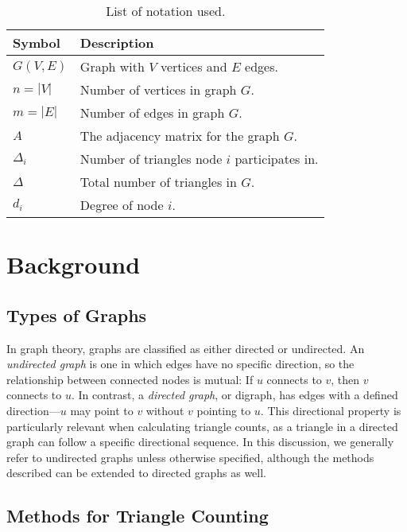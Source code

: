 \documentclass[11pt]{article}
\begin{document}
\begin{table}[ht]
    \centering
    \begin{tabular}{ll}
        \toprule
        \textbf{Symbol} & \textbf{Description} \\
        \midrule
        $G(V, E)$       & Graph with $V$ vertices and $E$ edges. \\
        $n = |V|$       & Number of vertices in graph $G$. \\
        $m = |E|$       & Number of edges in graph $G$. \\
        $A$             & The adjacency matrix for the graph $G$. \\
        $\Delta_i$      & Number of triangles node $i$ participates in. \\
        $\Delta$        & Total number of triangles in $G$. \\
        $d_i$           & Degree of node $i$. \\
        \bottomrule
    \end{tabular}
    \caption{List of notation used.}
    \label{tab:notation}
\end{table}

\section{Background}

\subsection{Types of Graphs}

In graph theory, graphs are classified as either directed or undirected.  
An \emph{undirected graph} is one in which edges have no specific direction, so the relationship between connected nodes is mutual: If $u$ connects to $v$, then $v$ connects to $u$.  
In contrast, a \emph{directed graph}, or digraph, has edges with a defined direction—$u$ may point to $v$ without $v$ pointing to $u$.  
This directional property is particularly relevant when calculating triangle counts, as a triangle in a directed graph can follow a specific directional sequence.  
In this discussion, we generally refer to undirected graphs unless otherwise specified, although the methods described can be extended to directed graphs as well.

\subsection{Methods for Triangle Counting}
\end{document}
